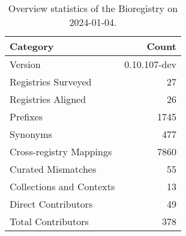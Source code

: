 \begin{table}
\caption{Overview statistics of the Bioregistry on 2024-01-04.}
\label{tab:bioregistry-summary}
\begin{tabular}{lr}
\toprule
Category & Count \\
\midrule
Version & 0.10.107-dev \\
Registries Surveyed & 27 \\
Registries Aligned & 26 \\
Prefixes & 1745 \\
Synonyms & 477 \\
Cross-registry Mappings & 7860 \\
Curated Mismatches & 55 \\
Collections and Contexts & 13 \\
Direct Contributors & 49 \\
Total Contributors & 378 \\
\bottomrule
\end{tabular}
\end{table}
